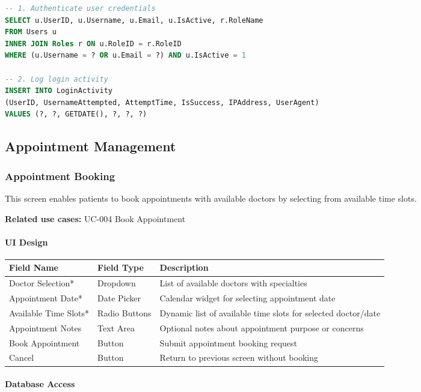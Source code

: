 \documentclass[12pt,a4paper]{article}
\begin{document}
\begin{lstlisting}[language=SQL]
-- 1. Authenticate user credentials
SELECT u.UserID, u.Username, u.Email, u.IsActive, r.RoleName
FROM Users u 
INNER JOIN Roles r ON u.RoleID = r.RoleID
WHERE (u.Username = ? OR u.Email = ?) AND u.IsActive = 1

-- 2. Log login activity
INSERT INTO LoginActivity 
(UserID, UsernameAttempted, AttemptTime, IsSuccess, IPAddress, UserAgent)
VALUES (?, ?, GETDATE(), ?, ?, ?)
\end{lstlisting}

\subsection{Appointment Management}

\subsubsection{Appointment Booking}

This screen enables patients to book appointments with available doctors by selecting from available time slots.

\textbf{Related use cases:} UC-004 Book Appointment

\paragraph{UI Design}

\begin{longtable}{|p{3cm}|p{3cm}|p{8cm}|}
\hline
\textbf{Field Name} & \textbf{Field Type} & \textbf{Description} \\
\hline
Doctor Selection* & Dropdown & List of available doctors with specialties \\
\hline
Appointment Date* & Date Picker & Calendar widget for selecting appointment date \\
\hline
Available Time Slots* & Radio Buttons & Dynamic list of available time slots for selected doctor/date \\
\hline
Appointment Notes & Text Area & Optional notes about appointment purpose or concerns \\
\hline
Book Appointment & Button & Submit appointment booking request \\
\hline
Cancel & Button & Return to previous screen without booking \\
\hline
\end{longtable}

\paragraph{Database Access}
\end{document}
